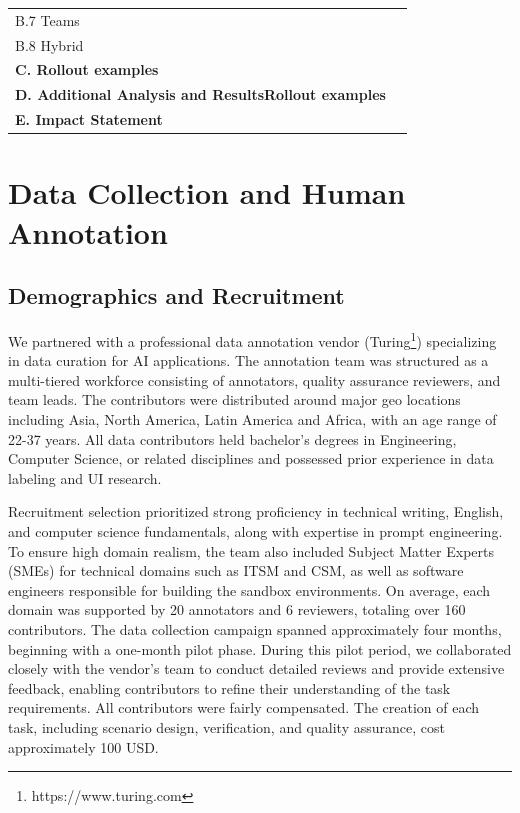 \begin{tabularx}{\linewidth}{Xr}
    \hspace{2em} B.7 Teams \dotfill & \pageref{app:cat_teams} \\  
    \hspace{2em} B.8 Hybrid \dotfill & \pageref{app:cat_hybrid} \\ 
    \textbf{C. Rollout examples} \dotfill & \pageref{app:errors} \\ 
    \textbf{D. Additional Analysis and ResultsRollout examples} \dotfill & \pageref{app:additional} \\  
    \textbf{E. Impact Statement} \dotfill & \pageref{app:impact} \\ 
\end{tabularx}

\newpage

\section{Data Collection and Human Annotation}
\label{app:annotation}

\subsection{Demographics and Recruitment}
\label{app:annot_demographics}
We partnered with a professional data annotation vendor (Turing\footnote{https://www.turing.com}) specializing in data curation for AI applications. The annotation team was structured as a multi-tiered workforce consisting of annotators, quality assurance reviewers, and team leads. The contributors were distributed around major geo locations including Asia, North America, Latin America and Africa, with an age range of 22-37 years. All data contributors held bachelor's degrees in Engineering, Computer Science, or related disciplines and possessed prior experience in data labeling and UI research. 

Recruitment selection prioritized strong proficiency in technical writing, English, and computer science fundamentals, along with expertise in prompt engineering. To ensure high domain realism, the team also included Subject Matter Experts (SMEs) for technical domains such as ITSM and CSM, as well as software engineers responsible for building the sandbox environments. On average, each domain was supported by 20 annotators and 6 reviewers, totaling over 160 contributors. The data collection campaign spanned approximately four months, beginning with a one-month pilot phase. During this pilot period, we collaborated closely with the vendor's team to conduct detailed reviews and provide extensive feedback, enabling contributors to refine their understanding of the task requirements. All contributors were fairly compensated. The creation of each task, including scenario design, verification, and quality assurance, cost approximately 100 USD.

